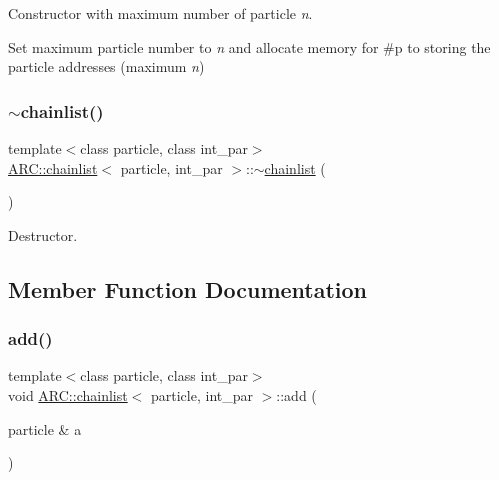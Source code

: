 Constructor with maximum number of particle {\itshape n}. 

Set maximum particle number to {\itshape n} and allocate memory for \#p to storing the particle addresses (maximum {\itshape n}) \hypertarget{classARC_1_1chainlist_a878d216d065759eea60b2acf566f0f92}{}\label{classARC_1_1chainlist_a878d216d065759eea60b2acf566f0f92} 
\subsubsection{\texorpdfstring{$\sim$chainlist()}{~chainlist()}}
{\footnotesize\ttfamily template$<$class particle, class int\+\_\+par$>$ \\
\hyperlink{classARC_1_1chainlist}{A\+R\+C\+::chainlist}$<$ particle, int\+\_\+par $>$\+::$\sim$\hyperlink{classARC_1_1chainlist}{chainlist} (\begin{DoxyParamCaption}{ }\end{DoxyParamCaption})\hspace{0.3cm}{\ttfamily [inline]}}



Destructor. 



\subsection{Member Function Documentation}
\hypertarget{classARC_1_1chainlist_ab04a5742cd27168e0404e57a67d6afd1}{}\label{classARC_1_1chainlist_ab04a5742cd27168e0404e57a67d6afd1} 
\subsubsection{\texorpdfstring{add()}{add()}\hspace{0.1cm}{\footnotesize\ttfamily [1/3]}}
{\footnotesize\ttfamily template$<$class particle, class int\+\_\+par$>$ \\
void \hyperlink{classARC_1_1chainlist}{A\+R\+C\+::chainlist}$<$ particle, int\+\_\+par $>$\+::add (\begin{DoxyParamCaption}\item[{particle \&}]{a }\end{DoxyParamCaption})\hspace{0.3cm}{\ttfamily [inline]}}



